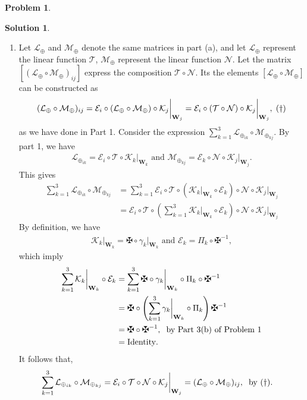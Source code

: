 \documentclass{book}
\theoremstyle{definition}
\newtheorem*{prob*}{Problem}
\newtheorem*{sln*}{Solution}
\newcommand{\W}{\mathbf{W}}
\newcommand{\lag}{\mathcal{L}}
\newcommand{\M}{\mathcal{M}}
\newcommand{\K}{\mathcal{K}}
\newcommand{\N}{\mathcal{N}}
\newcommand{\E}{\mathcal{E}}
\newcommand{\T}{\mathcal{T}}
\begin{document}
\begin{prob*}
\begin{sln*}
\begin{enumerate}
\begin{enumerate}
				
				\item Let $\lag_\oplus$ and $\M_\oplus$ denote the same matrices in part (a), and let $\lag_\oplus$ represent the linear function $\T$, $\M_\oplus$ represent the linear function $\N$. Let the matrix $[(\lag_\oplus\circ\M_\oplus)_{ij}] $ express the composition $\T\circ\N$. Its the elements $[\lag_\oplus\circ\M_\oplus] $ can be constructed as
				\begin{align*}
				(\lag_\oplus\circ\M_\oplus)_{ij} = \E_i \circ (\lag_\oplus \circ \M_\oplus) \circ \K_j\bigg\vert_{\W_j} = \E_i \circ (\T \circ \N) \circ \K_j\bigg\vert_{\W_j} ,\hspace{0.1cm}(\dagger)
				\end{align*}
				as we have done in Part 1. Consider the expression $\sum^3_{k=1}\lag_{\oplus_{ik}}\circ\M_{\oplus_{kj}}$. By part 1, we have
				\begin{align*}
				\lag_{\oplus_{ik}} = \E_i \circ \T \circ \K_k\bigg\vert_{\W_k}\text{ and }\M_{\oplus_{kj}} = \E_k \circ \N \circ \K_j\bigg\vert_{\W_j}.
				\end{align*} 
				This gives
				\begin{align*}
				\sum^3_{k=1}\lag_{\oplus_{ik}}\circ\M_{\oplus_{kj}}
				&= \sum^3_{k=1} \E_i \circ \T \circ \left(\K_k\bigg\vert_{\W_k}\circ \E_k \right)\circ \N \circ \K_j\bigg\vert_{\W_j}\\
				&= \E_i \circ \T \circ \left(\sum^3_{k=1}\K_k\bigg\vert_{\W_k}\circ \E_k\right)  \circ \N \circ \K_j\bigg\vert_{\W_j}
				\end{align*}
				By definition, we have
				\begin{align*}
				\K_k\bigg\vert_{\W_k} = \maltese\circ \gamma_k\bigg\vert_{\W_k}\text{ and }\E_k= \Pi_k\circ\maltese^{-1},
				\end{align*}
				which imply
				\begin{align*}
				\sum^3_{k=1}\K_k\bigg\vert_{\W_k}\circ \E_k &= \sum^3_{k=1} \maltese\circ \gamma_k\bigg\vert_{\W_k}\circ \Pi_k\circ\maltese^{-1}\\
				&= \maltese \circ \left(\sum^3_{k=1} \gamma_k\bigg\vert_{\W_k}\circ \Pi_k \right)\maltese^{-1}\\
				&= \maltese\circ\maltese^{-1},\hspace{0.2cm}\text{by Part 3(b) of Problem 1}\\
				&= \text{Identity}.
				\end{align*}
				It follows that,
				\begin{align*}
					\sum^3_{k=1}\lag_{\oplus_{ik}}\circ\M_{\oplus_{kj}} &= \E_i \circ \T\circ\N\circ\K_j\bigg\vert_{\W_j}= (\lag_\oplus\circ\M_\oplus)_{ij},\hspace{0.2cm}\text{by $(\dagger)$}.

\end{align*}
\end{enumerate}
\end{enumerate}
\end{sln*}
\end{prob*}
\end{document}
